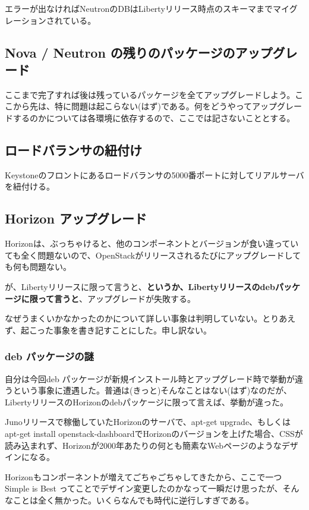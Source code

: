 \documentclass[9pt,b5paper,tombo,openany]{jsbook}
\begin{document}
\noindent
エラーが出なければNeutronのDBはLibertyリリース時点のスキーマまでマイグレーションされている。

\subsection{Nova / Neutron の残りのパッケージのアップグレード}
ここまで完了すれば後は残っているパッケージを全てアップグレードしよう。ここから先は、特に問題は起こらない(はず)である。何をどうやってアップグレードするのかについては各環境に依存するので、ここでは記さないこととする。

\subsection{ロードバランサの紐付け}
Keystoneのフロントにあるロードバランサの5000番ポートに対してリアルサーバを紐付ける。

\subsection{Horizon アップグレード}
Horizonは、ぶっちゃけると、他のコンポーネントとバージョンが食い違っていても全く問題ないので、OpenStackがリリースされるたびにアップグレードしても何も問題ない。

が、Libertyリリースに限って言うと、\textbf{というか、Libertyリリースのdebパッケージに限って言うと}、アップグレードが失敗する。

なぜうまくいかなかったのかについて詳しい事象は判明していない。とりあえず、起こった事象を書き記すことにした。申し訳ない。

\subsubsection{deb パッケージの謎}
自分は今回deb パッケージが新規インストール時とアップグレード時で挙動が違うという事象に遭遇した。普通は(きっと)そんなことはない(はず)なのだが、LibertyリリースのHorizonのdebパッケージに限って言えば、挙動が違った。

Junoリリースで稼働していたHorizonのサーバで、apt-get upgrade、もしくはapt-get install openstack-dashboardでHorizonのバージョンを上げた場合、CSSが読み込まれず、Horizonが2000年あたりの何とも簡素なWebページのようなデザインになる。

Horizonもコンポーネントが増えてごちゃごちゃしてきたから、ここで一つ Simple is Best ってことでデザイン変更したのかなって一瞬だけ思ったが、そんなことは全く無かった。いくらなんでも時代に逆行しすぎである。\\[1ex]
\end{document}
